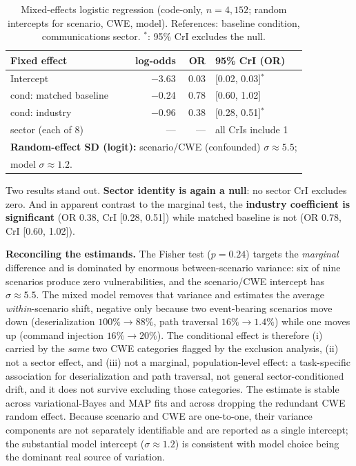 \documentclass[sigconf,review,anonymous]{acmart}
\begin{document}
\begin{table}[t]
\caption{Mixed-effects logistic regression (code-only, $n=4{,}152$; random intercepts for scenario, CWE, model). References: baseline condition, communications sector. $^{*}$: 95\% CrI excludes the null.}
\label{tab:mixed}
\centering
\footnotesize
\begin{tabular}{lrrl}
\toprule
\textbf{Fixed effect} & \textbf{log-odds} & \textbf{OR} & \textbf{95\% CrI (OR)} \\
\midrule
Intercept & $-$3.63 & 0.03 & [0.02, 0.03]$^{*}$ \\
cond: matched baseline & $-$0.24 & 0.78 & [0.60, 1.02] \\
cond: industry & $-$0.96 & 0.38 & [0.28, 0.51]$^{*}$ \\
sector (each of 8) & --- & --- & all CrIs include 1 \\
\midrule
\multicolumn{4}{l}{\textbf{Random-effect SD (logit):} scenario/CWE (confounded) $\sigma \approx 5.5$;} \\
\multicolumn{4}{l}{model $\sigma \approx 1.2$.} \\
\bottomrule
\end{tabular}
\end{table}

Two results stand out. \textbf{Sector identity is again a null}: no sector CrI excludes zero. And in apparent contrast to the marginal test, the \textbf{industry coefficient is significant} (OR 0.38, CrI [0.28, 0.51]) while matched baseline is not (OR 0.78, CrI [0.60, 1.02]).

\textbf{Reconciling the estimands.} The Fisher test ($p=0.24$) targets the \emph{marginal} difference and is dominated by enormous between-scenario variance: six of nine scenarios produce zero vulnerabilities, and the scenario/CWE intercept has $\sigma \approx 5.5$. The mixed model removes that variance and estimates the average \emph{within}-scenario shift, negative only because two event-bearing scenarios move down (deserialization $100\% \rightarrow 88\%$, path traversal $16\% \rightarrow 1.4\%$) while one moves up (command injection $16\% \rightarrow 20\%$). The conditional effect is therefore (i) carried by the \emph{same} two CWE categories flagged by the exclusion analysis, (ii) not a sector effect, and (iii) not a marginal, population-level effect: a task-specific association for deserialization and path traversal, not general sector-conditioned drift, and it does not survive excluding those categories. The estimate is stable across variational-Bayes and MAP fits and across dropping the redundant CWE random effect. Because scenario and CWE are one-to-one, their variance components are not separately identifiable and are reported as a single intercept; the substantial model intercept ($\sigma \approx 1.2$) is consistent with model choice being the dominant real source of variation.
\end{document}
